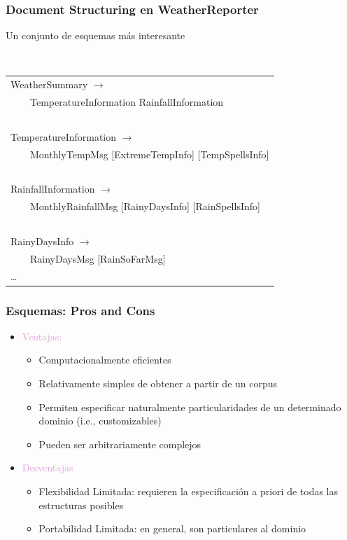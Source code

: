 \documentclass[compress,color=usenames]{beamer}
\newcommand{\mH}[1]{\textcolor{Plum}{#1}}
\begin{document}
\begin{frame}
\frametitle{Document Structuring en WeatherReporter}

Un conjunto de esquemas m\'as interesante
\vspace*{-.6cm}

\begin{center}\tt
\begin{tabular}{l}
WeatherSummary $\to$      \\
\ \ \ \ TemperatureInformation RainfallInformation\\
\ \\
TemperatureInformation $\to$\\
\ \ \ \  MonthlyTempMsg [ExtremeTempInfo] [TempSpellsInfo]\\
\ \\
RainfallInformation $\to$\\
\ \ \ \  MonthlyRainfallMsg [RainyDaysInfo] [RainSpellsInfo]\\
\ \\
RainyDaysInfo $\to$\\
\ \ \ \  RainyDaysMsg [RainSoFarMsg]\\
\ldots
\end{tabular}
\end{center}

\end{frame}

\begin{frame}
\frametitle{Esquemas: Pros and Cons}

\label{f148}
\begin{itemize}
\item { \mH{Ventajas:}}
\begin{itemize}
\item Computacionalmente eficientes
\item Relativamente simples de obtener a partir de un corpus
\item Permiten especificar naturalmente particularidades de un determinado dominio (i.e., customizables)
\item Pueden ser arbitrariamente complejos 
\end{itemize}
\item { \mH{Desventajas}}
\begin{itemize}
\item { {Flexibilidad Limitada: requieren la especificaci\'on a priori de todas las estructuras posibles}}
\item { {Portabilidad Limitada: en general, son particulares al dominio}}
\end{itemize}
\end{itemize} 
\end{frame}
\end{document}
